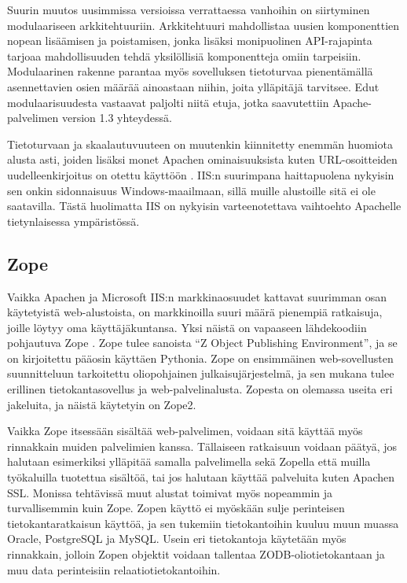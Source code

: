 Suurin muutos uusimmissa versioissa verrattaessa vanhoihin on
siirtyminen modulaariseen arkkitehtuuriin. Arkkitehtuuri mahdollistaa uusien komponenttien nopean lisäämisen ja poistamisen, jonka lisäksi  
monipuolinen API-rajapinta tarjoaa mahdollisuuden tehdä yksilöllisiä komponentteja omiin tarpeisiin. Modulaarinen rakenne parantaa myös sovelluksen tietoturvaa pienentämällä asennettavien 
osien määrää ainoastaan niihin, joita ylläpitäjä tarvitsee. Edut modulaarisuudesta
vastaavat paljolti niitä etuja, jotka saavutettiin Apache-palvelimen version
1.3 yhteydessä.

Tietoturvaan ja skaalautuvuuteen on muutenkin kiinnitetty enemmän huomiota alusta asti, joiden lisäksi monet Apachen ominaisuuksista
kuten URL-osoitteiden uudelleenkirjoitus on otettu käyttöön \cite{IIS}. IIS:n suurimpana haittapuolena nykyisin sen onkin sidonnaisuus Windows-maailmaan, sillä muille alustoille sitä ei ole 
saatavilla. Tästä huolimatta IIS on nykyisin varteenotettava vaihtoehto Apachelle tietynlaisessa ympäristössä. 

\subsection{Zope}

Vaikka Apachen ja Microsoft IIS:n markkinaosuudet kattavat suurimman osan käytetyistä web-alustoista, on markkinoilla suuri määrä pienempiä ratkaisuja, joille löytyy oma käyttäjäkuntansa. Yksi 
näistä on vapaaseen lähdekoodiin pohjautuva Zope \cite{Zope}. Zope tulee sanoista ``Z Object Publishing Environment'', ja se on kirjoitettu pääosin käyttäen Pythonia. Zope on ensimmäinen
web-sovellusten suunnitteluun tarkoitettu oliopohjainen julkaisujärjestelmä, ja sen mukana tulee erillinen tietokantasovellus ja web-palvelinalusta. Zopesta on olemassa useita eri jakeluita, ja 
näistä käytetyin on Zope2. 

Vaikka Zope itsessään sisältää web-palvelimen, voidaan sitä käyttää myös rinnakkain muiden palvelimien kanssa. Tällaiseen ratkaisuun voidaan päätyä, jos halutaan esimerkiksi ylläpitää samalla
palvelimella sekä Zopella että muilla työkaluilla tuotettua sisältöä, tai jos halutaan käyttää palveluita kuten Apachen SSL. Monissa tehtävissä muut alustat toimivat myös nopeammin ja 
turvallisemmin kuin Zope. Zopen käyttö ei myöskään sulje perinteisen tietokantaratkaisun käyttöä, ja sen tukemiin tietokantoihin kuuluu muun muassa Oracle, PostgreSQL ja MySQL. Usein eri 
tietokantoja käytetään myös rinnakkain, jolloin Zopen objektit voidaan tallentaa ZODB-oliotietokantaan ja muu data perinteisiin relaatiotietokantoihin. 

